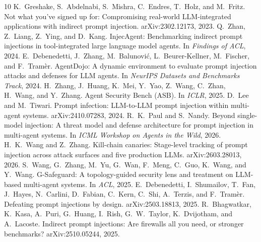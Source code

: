 \documentclass[11pt]{article}
\begin{document}
\begin{thebibliography}{10}
 K.~Greshake, S.~Abdelnabi, S.~Mishra, C.~Endres, T.~Holz, and M.~Fritz. Not what you've signed up for: Compromising real-world LLM-integrated applications with indirect prompt injection. arXiv:2302.12173, 2023.
 Q.~Zhan, Z.~Liang, Z.~Ying, and D.~Kang. InjecAgent: Benchmarking indirect prompt injections in tool-integrated large language model agents. In \emph{Findings of ACL}, 2024.
 E.~Debenedetti, J.~Zhang, M.~Balunovi\'c, L.~Beurer-Kellner, M.~Fischer, and F.~Tram\`er. AgentDojo: A dynamic environment to evaluate prompt injection attacks and defenses for LLM agents. In \emph{NeurIPS Datasets and Benchmarks Track}, 2024.
 H.~Zhang, J.~Huang, K.~Mei, Y.~Yao, Z.~Wang, C.~Zhan, H.~Wang, and Y.~Zhang. Agent Security Bench (ASB). In \emph{ICLR}, 2025.
 D.~Lee and M.~Tiwari. Prompt infection: LLM-to-LLM prompt injection within multi-agent systems. arXiv:2410.07283, 2024.
 R.~K.~Paul and S.~Nandy. Beyond single-model injection: A threat model and defense architecture for prompt injection in multi-agent systems. In \emph{ICML Workshop on Agents in the Wild}, 2026.
 H.~K.~Wang and Z.~Zhang. Kill-chain canaries: Stage-level tracking of prompt injection across attack surfaces and five production LLMs. arXiv:2603.28013, 2026.
 S.~Wang, G.~Zhang, M.~Yu, G.~Wan, F.~Meng, C.~Guo, K.~Wang, and Y.~Wang. G-Safeguard: A topology-guided security lens and treatment on LLM-based multi-agent systems. In \emph{ACL}, 2025.
 E.~Debenedetti, I.~Shumailov, T.~Fan, J.~Hayes, N.~Carlini, D.~Fabian, C.~Kern, C.~Shi, A.~Terzis, and F.~Tram\`er. Defeating prompt injections by design. arXiv:2503.18813, 2025.
 R.~Bhagwatkar, K.~Kasa, A.~Puri, G.~Huang, I.~Rish, G.~W.~Taylor, K.~Dvijotham, and A.~Lacoste. Indirect prompt injections: Are firewalls all you need, or stronger benchmarks? arXiv:2510.05244, 2025.
\end{thebibliography}
\end{document}
